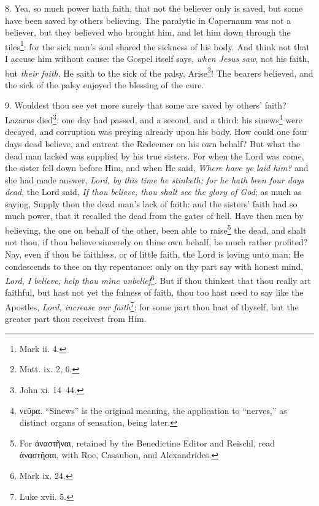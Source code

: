 8. Yea, so much power hath faith, that not the believer only is saved, but some have been saved by others believing. The paralytic in Capernaum was not a believer, but they believed who brought him, and let him down through the tiles\footnote{Mark ii. 4.}: for the sick man’s soul shared the sickness of his body. And think not that I accuse him without cause: the Gospel itself says, \emph{when Jesus saw}, not his faith, but \emph{their faith}, He saith to the sick of the palsy, Arise\footnote{Matt. ix. 2, 6.}! The bearers believed, and the sick of the palsy enjoyed the blessing of the cure.

9. Wouldest thou see yet more surely that some are saved by others’ faith? Lazarus died\footnote{John xi. 14–44.}: one day had passed, and a second, and a third: his sinews\footnote{\textgreek{νεῦρα}. “Sinews” is the original meaning, the application to “nerves,” as distinct organs of sensation, being later.} were decayed, and corruption was preying already upon his body. How could one four days dead believe, and entreat the Redeemer on his own behalf? But what the dead man lacked was supplied by his true sisters. For when the Lord was come, the sister fell down before Him, and when He said, \emph{Where have ye laid him?} and she had made answer, \emph{Lord, by this time he stinketh; for he hath been four days dead}, the Lord said, \emph{If thou believe, thou shalt see the glory of God}; as much as saying, Supply thou the dead man’s lack of faith: and the sisters’ faith had so much power, that it recalled the dead from the gates of hell. Have then men by believing, the one on behalf of the other, been able to raise\footnote{For \textgreek{ἀναστῆναι}, retained by the Benedictine Editor and Reischl, read \textgreek{ἀναστῆσαι}, with Roe, Casaubon, and Alexandrides.} the dead, and shalt not thou, if thou believe sincerely on thine own behalf, be much rather profited? Nay, even if thou be faithless, or of little faith, the Lord is loving unto man; He condescends to thee on thy repentance: only on thy part say with honest mind, \emph{Lord, I believe, help thou mine unbelief}\footnote{Mark ix. 24.}. But if thou thinkest that thou really art faithful, but hast not yet the fulness of faith, thou too hast need to say like the Apostles, \emph{Lord, increase our faith}\footnote{Luke xvii. 5.}: for some part thou hast of thyself, but the greater part thou receivest from Him.


